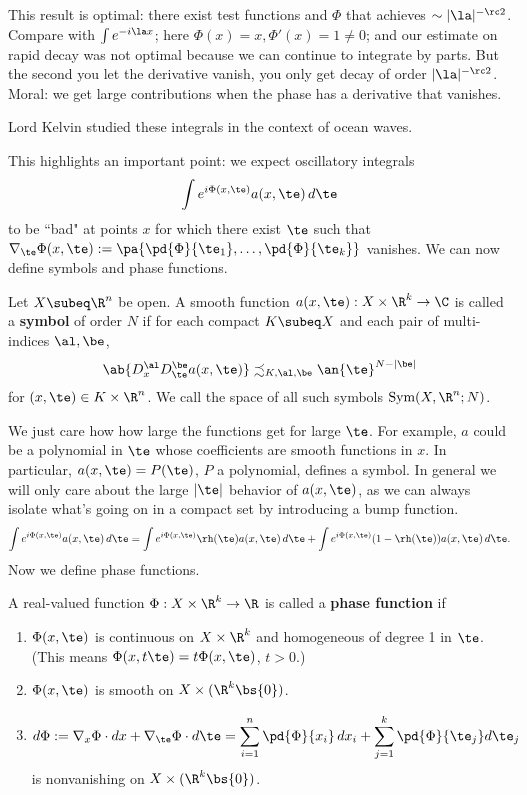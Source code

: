 This result is optimal: there exist test functions and $\Phi$ that achieves $\sim|\la|^{-\rc2}$. Compare with $\int e^{-i\la x}$; here $\Phi(x)=x,\Phi'(x)=1\ne 0$; and our estimate on rapid decay was not optimal because we can continue to integrate by parts. 
But the second you let the derivative vanish, you only get decay of order $|\la|^{-\rc2}$. Moral: we get large contributions when the phase has a derivative that vanishes.

Lord Kelvin studied these integrals in the context of ocean waves.

This highlights an important point: we expect oscillatory integrals
\[
\int e^{i\Phi(x,\te)}a(x,\te)\,d\te
\]
to be ``bad" at points $x$ for which there exist $\te$ such that $\nabla_\te\Phi(x,\te):=\pa{\pd{\Phi}{\te_1},\ldots, \pd{\Phi}{\te_k}}$ vanishes. 
We can now define symbols and phase functions.
\begin{df}
Let $X\subeq \R^n$ be open. A smooth function $a(x,\te):X\times \R^k\to \C$ is called a \textbf{symbol} of order $N$ if for each compact $K\subeq X$ and each pair of multi-indices $\al,\be$, 
\[
\ab{D_x^{\al}D_{\te}^{\be} a(x,\te)}\precsim_{K,\al,\be}
\an{\te}^{N-|\be|}
\]
for $(x,\te)\in K\times \R^n$. We call the space of all such symbols $\text{Sym}(X,\R^n;N)$. 
\end{df}
We just care how how large the functions get for large $\te$. For example, $a$ could be a polynomial in $\te$ whose coefficients are smooth functions in $x$.
In particular, $a(x,\te)=P(\te)$, $P$ a polynomial, defines a symbol. In general we will only care about the large $|\te|$ behavior of $a(x,\te)$, 
as we can always isolate what's going on in a compact set by introducing a bump function.
\[
\int e^{i\Phi(x,\te)}a(x,\te)\,d\te=\int e^{i\Phi(x,\te)} \rh(\te)a(x,\te)\,d\te
+\int e^{i\Phi(x,\te)}(1-\rh(\te))a(x,\te)\,d\te.
\]
Now we define phase functions.
\begin{df}
A real-valued function $\Phi:X\times \R^k\to \R$ is called a \textbf{phase function} if
\begin{enumerate}
\item
$\Phi(x,\te)$ is continuous on $X\times \R^k$ and homogeneous of degree 1 in $\te$. (This means $\Phi(x,t\te)=t\Phi(x,\te)$, $t>0$.)
\item
$\Phi(x,\te)$ is smooth on $X\times (\R^k\bs \{0\})$. 
\item
\[d\Phi:=\nabla_x\Phi\cdot dx+\nabla_{\te}\Phi\cdot d\te
=\sum_{i=1}^n \pd{\Phi}{x_i}\,dx_i+\sum_{j=1}^k \pd{\Phi}{\te_j}d\te_j
\] is nonvanishing on $X\times (\R^k\bs \{0\})$. 
\end{enumerate}
\end{df}
